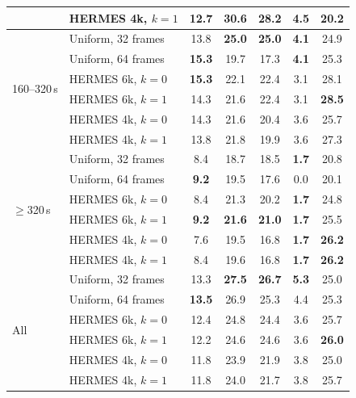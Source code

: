 \begin{table}[t]
\begin{tabular}{llccccc}
 & HERMES 4k, $k{=}1$ & 12.7 & 30.6 & 28.2 & 4.5 & 20.2 \\
\midrule
\multirow{6}{*}{160--320\,s} & Uniform, 32 frames & 13.8 & \textbf{25.0} & \textbf{25.0} & \textbf{4.1} & 24.9 \\
 & Uniform, 64 frames & \textbf{15.3} & 19.7 & 17.3 & \textbf{4.1} & 25.3 \\
\cmidrule(lr){2-7}
 & HERMES 6k, $k{=}0$ & \textbf{15.3} & 22.1 & 22.4 & 3.1 & 28.1 \\
 & HERMES 6k, $k{=}1$ & 14.3 & 21.6 & 22.4 & 3.1 & \textbf{28.5} \\
 & HERMES 4k, $k{=}0$ & 14.3 & 21.6 & 20.4 & 3.6 & 25.7 \\
 & HERMES 4k, $k{=}1$ & 13.8 & 21.8 & 19.9 & 3.6 & 27.3 \\
\midrule
\multirow{6}{*}{$\geq$320\,s} & Uniform, 32 frames & 8.4 & 18.7 & 18.5 & \textbf{1.7} & 20.8 \\
 & Uniform, 64 frames & \textbf{9.2} & 19.5 & 17.6 & 0.0 & 20.1 \\
\cmidrule(lr){2-7}
 & HERMES 6k, $k{=}0$ & 8.4 & 21.3 & 20.2 & \textbf{1.7} & 24.8 \\
 & HERMES 6k, $k{=}1$ & \textbf{9.2} & \textbf{21.6} & \textbf{21.0} & \textbf{1.7} & 25.5 \\
 & HERMES 4k, $k{=}0$ & 7.6 & 19.5 & 16.8 & \textbf{1.7} & \textbf{26.2} \\
 & HERMES 4k, $k{=}1$ & 8.4 & 19.6 & 16.8 & \textbf{1.7} & \textbf{26.2} \\
\midrule[\heavyrulewidth]
\multirow{6}{*}{All} & Uniform, 32 frames & 13.3 & \textbf{27.5} & \textbf{26.7} & \textbf{5.3} & 25.0 \\
 & Uniform, 64 frames & \textbf{13.5} & 26.9 & 25.3 & 4.4 & 25.3 \\
\cmidrule(lr){2-7}
 & HERMES 6k, $k{=}0$ & 12.4 & 24.8 & 24.4 & 3.6 & 25.7 \\
 & HERMES 6k, $k{=}1$ & 12.2 & 24.6 & 24.6 & 3.6 & \textbf{26.0} \\
 & HERMES 4k, $k{=}0$ & 11.8 & 23.9 & 21.9 & 3.8 & 25.0 \\
 & HERMES 4k, $k{=}1$ & 11.8 & 24.0 & 21.7 & 3.8 & 25.7 \\
\bottomrule
\end{tabular}
\end{table}
